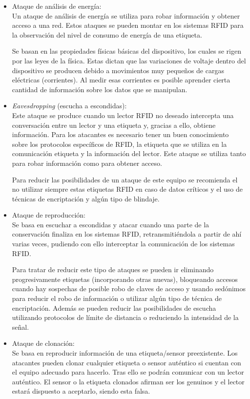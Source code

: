 \documentclass[12pt,a4paper,onecolumn,oneside]{report}
\begin{document}
\begin{itemize}

\item Ataque de análisis de energía:\\ 
Un ataque de análisis de energía se utiliza para robar información y obtener acceso a una red. Estos ataques se pueden montar en los sistemas RFID para la observación del nivel de consumo de energía de una etiqueta. 

Se basan en las propiedades físicas básicas del dispositivo, los cuales se rigen por las leyes de la física. Estas dictan que las variaciones de voltaje dentro del dispositivo se producen debido a movimientos muy pequeños de cargas eléctricas (corrientes). Al medir esas corrientes es posible aprender cierta cantidad de información sobre los datos que se manipulan.

\item \textit{Eavesdropping} (escucha a escondidas):\\
Este ataque se produce cuando un lector RFID no deseado intercepta una conversación entre un lector y una etiqueta y, gracias a ello, obtiene información. Para los atacantes es necesario tener un buen conocimiento sobre los protocolos específicos de RFID, la etiqueta que se utiliza en la comunicación etiqueta y la información del lector. Este ataque se utiliza tanto para robar información como para obtener acceso.

Para reducir las posibilidades de un ataque de este equipo se recomienda el no utilizar siempre estas etiquetas RFID en caso de datos críticos y el uso de técnicas de encriptación y algún tipo de blindaje.

\item Ataque de reproducción:\\
Se basa en escuchar a escondidas y atacar cuando una parte de la conservación finaliza en los sistemas RFID, retransmitiéndola a partir de ahí varias veces, pudiendo con ello interceptar la comunicación de los sistemas RFID. 

Para tratar de reducir este tipo de ataques se pueden ir eliminando progresivamente etiquetas (incorporando otras nuevas), bloqueando  accesos cuando hay sospechas de posible robo de claves de acceso y usando sedónimos para reducir el robo de información o utilizar algún tipo de técnica de encriptación. Además se pueden reducir las posibilidades de escucha utilizando protocolos de límite de distancia o reduciendo la intensidad de la señal.

\item Ataque de clonación:\\
Se basa en reproducir información de una etiqueta/sensor preexistente. Los atacantes pueden clonar cualquier etiqueta o sensor auténtico si cuentan con el equipo adecuado para hacerlo. Tras ello se podrán comunicar con un lector auténtico. El sensor o la etiqueta clonados afirman ser los genuinos y el lector estará dispuesto a aceptarlo, siendo esta falsa.


\end{itemize}
\end{document}
